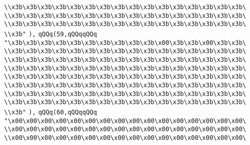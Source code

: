 \verb|\\x3b\x3b\x3b\x3b\x3b\x3b\x3b\x3b\x3b\x3b\x3b\x3b\x3b\x3b\x3b\x3b\|\newline
\verb|\\x3b\x3b\x3b\x3b\x3b\x3b\x3b\x3b\x3b\x3b\x3b\x3b\x3b\x3b\x3b\x3b\|\newline
\verb|\\x3b\x3b\x3b\x3b\x3b\x3b\x3b\x3b\x3b\x3b\x3b\x3b\x3b\x3b\x3b\x3b\|\newline
\verb|\\x3b"|\newline
\verb|),|\newline
\verb|qQQq(59,qQQqqQQq|\newline
\verb|"\x3b\x3b\x3b\x3b\x3b\x3b\x3b\x3b\x3b\x3b\x00\x3b\x3b\x00\x3b\x3b\|\newline
\verb|\\x3b\x3b\x3b\x3b\x3b\x3b\x3b\x3b\x3b\x3b\x3b\x3b\x3b\x3b\x3b\x3b\|\newline
\verb|\\x3b\x3b\x3b\x3b\x3b\x3b\x3b\x3b\x3b\x3b\x3b\x3b\x3b\x3b\x3b\x3b\|\newline
\verb|\\x3b\x3b\x3b\x3b\x3b\x3b\x3b\x3b\x3b\x3b\x3b\x3b\x3b\x3b\x3b\x3b\|\newline
\verb|\\x3b\x3b\x3b\x3b\x3b\x3b\x3b\x3b\x3b\x3b\x3b\x3b\x3b\x3b\x3b\x3b\|\newline
\verb|\\x3b\x3b\x3b\x3b\x3b\x3b\x3b\x3b\x3b\x3b\x3b\x3b\x3b\x3b\x3b\x3b\|\newline
\verb|\\x3b\x3b\x3b\x3b\x3b\x3b\x3b\x3b\x3b\x3b\x3b\x3b\x3b\x3b\x3b\x3b\|\newline
\verb|\\x3b\x3b\x3b\x3b\x3b\x3b\x3b\x3b\x3b\x3b\x3b\x3b\x3b\x3b\x3b\x3b\|\newline
\verb|\\x3b"|\newline
\verb|),|\newline
\verb|qQQq(60,qQQqqQQq|\newline
\verb|"\x00\x00\x00\x00\x00\x00\x00\x00\x00\x00\x00\x00\x00\x00\x00\x00\|\newline
\verb|\\x00\x00\x00\x00\x00\x00\x00\x00\x00\x00\x00\x00\x00\x00\x00\x00\|\newline
\verb|\\x00\x00\x00\x00\x00\x00\x00\x00\x00\x00\x00\x00\x00\x00\x00\x00\|\newline
